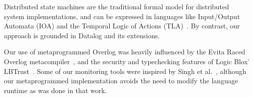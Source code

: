

Distributed state machines are the traditional formal model for distributed system implementations, and can be expressed in languages like Input/Output Automata (IOA) and the Temporal Logic of Actions (TLA)~\cite{lynchbook}.  By contrast, our approach is grounded in Datalog and its extensions.  %

Our use of metaprogrammed Overlog was heavily influenced by the Evita Raced
Overlog metacompiler~\cite{evitaraced}, and the security and typechecking
features of Logic Blox' LBTrust~\cite{lbtrust}.  Some of our monitoring tools
were inspired by Singh et al.~\cite{singh-eurosys}, although our metaprogrammed
implementation avoids the need to modify the language runtime as was done in that work.
